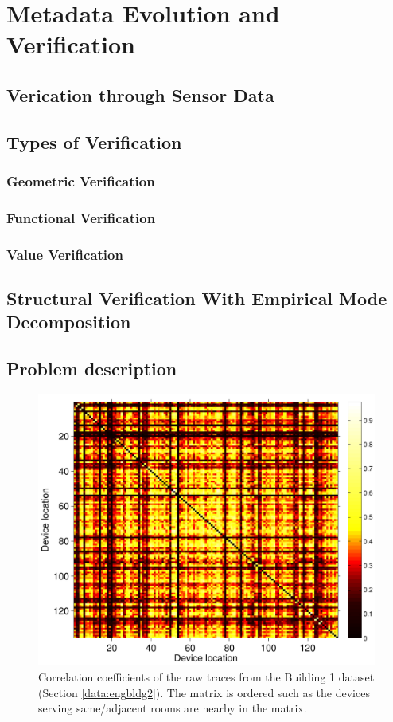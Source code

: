 \chapter{Metadata Evolution and Verification}

\section{Verication through Sensor Data}

\section{Types of Verification}
\subsection{Geometric Verification}
\subsection{Functional Verification}
\subsection{Value Verification}

\section{Structural Verification With Empirical Mode Decomposition}

\section{Problem description}
\begin{figure}
\begin{center}
\includegraphics[width=.5\textwidth]{figs/heatMap_raw_201106-eps-converted-to.pdf}
\caption{Correlation coefficients of the raw traces from the Building 1 dataset (Section \ref{data:engbldg2}).
The matrix is ordered such as the devices serving same/adjacent rooms are nearby in the matrix.}
\label{fig:heatmap:raw}
\end{center}
\end{figure}

